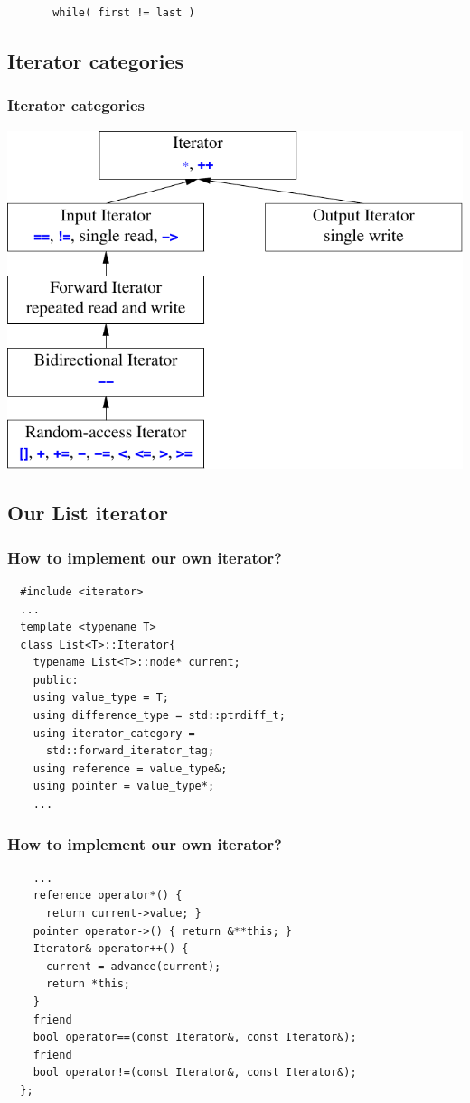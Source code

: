 \begin{frame}[fragile]
  \vfill
  \begin{lstlisting}
       while( first != last )
  \end{lstlisting}
  \vfill
\end{frame}


\subsection{Iterator categories}
\begin{frame}
  \frametitle{Iterator categories}
  \centering
  \includegraphics[height=0.8\textheight]{img/iterators.png}
\end{frame}


\subsection{Our List iterator}
\begin{frame}[fragile]
  \frametitle{How to implement our own iterator?}
\begin{lstlisting}
  #include <iterator>
  ...
  template <typename T>
  class List<T>::Iterator{
    typename List<T>::node* current;
    public:
    using value_type = T;
    using difference_type = std::ptrdiff_t;
    using iterator_category =
      std::forward_iterator_tag;
    using reference = value_type&;
    using pointer = value_type*;
    ...
\end{lstlisting}
\end{frame}

\begin{frame}[fragile]
  \frametitle{How to implement our own iterator?}
\begin{lstlisting}
    ...
    reference operator*() {
      return current->value; }
    pointer operator->() { return &**this; }
    Iterator& operator++() {
      current = advance(current);
      return *this;
    }
    friend
    bool operator==(const Iterator&, const Iterator&);
    friend
    bool operator!=(const Iterator&, const Iterator&);
  };
\end{lstlisting}
\end{frame}

